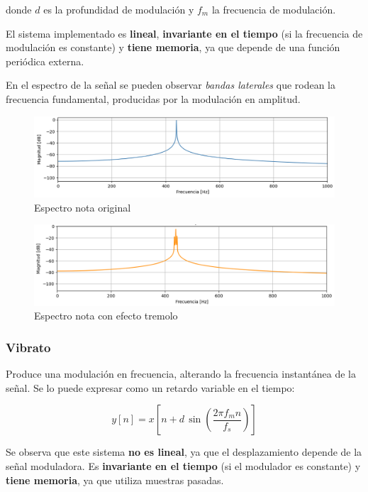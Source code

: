 \documentclass[12pt]{article}
\begin{document}
donde $d$ es la profundidad de modulación y $f_m$ la frecuencia de modulación.

El sistema implementado es \textbf{lineal}, \textbf{invariante en el tiempo} (si la frecuencia de modulación es constante) y \textbf{tiene memoria}, ya que depende de una función periódica externa.  

En el espectro de la señal se pueden observar \textit{bandas laterales} que rodean la frecuencia fundamental, producidas por la modulación en amplitud.

\begin{figure}[H]
    \centering
    \includegraphics[width=0.75\linewidth]{plot/trembolo_original.png}
    \caption{Espectro nota original}
    \label{trembolo_original}
\end{figure}

\begin{figure}[H]
    \centering
    \includegraphics[width=0.75\linewidth]{plot/trembolo_efecto.png}
    \caption{Espectro nota con efecto tremolo}
    \label{trembolo_efecto}
\end{figure}

\subsubsection{Vibrato}

Produce una modulación en frecuencia, alterando la frecuencia instantánea de la señal. Se lo puede expresar como un retardo variable en el tiempo:

\[
y[n] = x\!\left[n + d \, \sin\!\left( \frac{2\pi f_m n}{f_s} \right)\right]
\]

Se observa que este sistema \textbf{no es lineal}, ya que el desplazamiento depende de la señal moduladora.  
Es \textbf{invariante en el tiempo} (si el modulador es constante) y \textbf{tiene memoria}, ya que utiliza muestras pasadas.  
\end{document}
